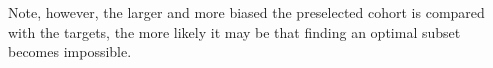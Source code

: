 \documentclass[10pt,letterpaper]{article}
\newcommand{\project}[1]{\textsl{#1}}
\newcommand{\entrofy}{\project{Entrofy}}
\begin{document}


Note, however, the larger and more biased the preselected cohort is compared with the targets, the more likely it may be that finding an optimal subset becomes impossible. 

\end{document}
